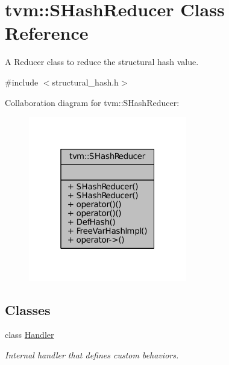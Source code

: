 \hypertarget{classtvm_1_1SHashReducer}{}\section{tvm\+:\+:S\+Hash\+Reducer Class Reference}
\label{classtvm_1_1SHashReducer}


A Reducer class to reduce the structural hash value.  




{\ttfamily \#include $<$structural\+\_\+hash.\+h$>$}



Collaboration diagram for tvm\+:\+:S\+Hash\+Reducer\+:
\nopagebreak
\begin{figure}[H]
\begin{center}
\leavevmode
\includegraphics[width=196pt]{classtvm_1_1SHashReducer__coll__graph}
\end{center}
\end{figure}
\subsection*{Classes}
\begin{DoxyCompactItemize}
\item 
class \hyperlink{classtvm_1_1SHashReducer_1_1Handler}{Handler}
\begin{DoxyCompactList}\small\item\em Internal handler that defines custom behaviors. \end{DoxyCompactList}\end{DoxyCompactItemize}
